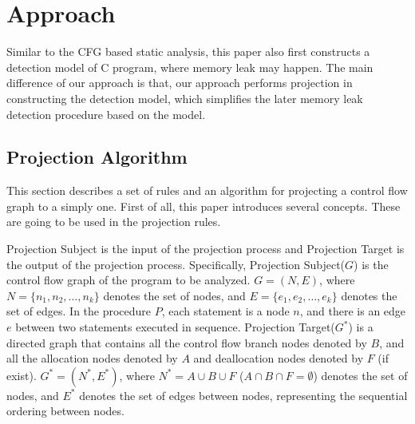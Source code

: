 \section{Approach}\label{sec:approach}
Similar to the CFG based static analysis, this paper also first constructs a detection model of C program, where memory leak may happen. The main difference of our approach is that, our approach performs projection in constructing the detection model, which simplifies the later memory leak detection procedure based on the model.

\subsection{Projection Algorithm}

This section describes a set of rules and an algorithm for projecting a control flow graph to a simply one. First of all, this paper introduces several concepts. These are going to be used in the projection rules.


Projection Subject is the input of the projection process and Projection Target is the output of the projection process. Specifically, Projection Subject($G$) is the control flow graph of the program to be analyzed. $G=(N, E)$, where $N = \{n_1, n_2, \ldots, n_k\}$ denotes the set of nodes, and $E = \{e_1, e_2, \ldots, e_k\}$ denotes the set of edges. In the procedure $P$, each statement is a node $n$, and there is an edge $e$ between two statements executed in sequence. Projection Target($G^*$) is a directed graph that contains all the control flow branch nodes denoted by $B$, and all the allocation nodes denoted by $A$ and deallocation nodes denoted by $F$ (if exist). $G^* = (N^*, E^*)$, where $N^* = A\cup B\cup F$ ($A\cap B\cap F=\emptyset$) denotes the set of nodes, and $E^*$ denotes the set of edges between nodes, representing the sequential ordering between nodes.


